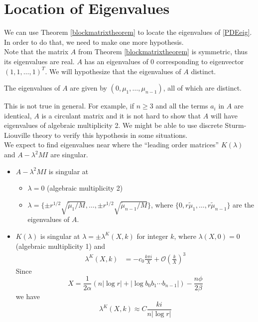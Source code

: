 \documentclass[thesis.tex]{subfiles}
\begin{document}
\section{Location of Eigenvalues}

We can use Theorem \ref{blockmatrixtheorem} to locate the eigenvalues of \eqref{PDEeig}. In order to do that, we need to make one more hypothesis.\\

Note that the matrix $A$ from Theorem \ref{blockmatrixtheorem} is symmetric, thus its eigenvalues are real. $A$ has an eigenvalues of 0 corresponding to eigenvector $(1, 1, \dots, 1)^T$. We will hypothesize that the eigenvalues of $A$ distinct. 

\begin{hypothesis}\label{Adistincteigs}
The eigenvalues of $A$ are given by $(0, \mu_1, \dots, \mu_{n-1})$, all of which are distinct.
\end{hypothesis}

This is not true in general. For example, if $n \geq 3$ and all the terms $a_i$ in $A$ are identical, $A$ is a circulant matrix and it is not hard to show that $A$ will have eigenvalues of algebraic multiplicity 2. We might be able to use discrete Sturm-Liouville theory to verify this hypothesis in some situations.\\

We expect to find eigenvalues near where the ``leading order matrices'' $K(\lambda)$ and $A - \lambda^2 MI$ are singular. 

\begin{itemize}
	\item $A - \lambda^2 M I$ is singular at 
	\begin{itemize}
		\item $\lambda = 0$ (algebraic multiplicity 2)
		\item $\lambda = \{ \pm r^{1/2} \sqrt{\tilde{\mu}_1/M}, \dots, \pm r^{1/2} \sqrt{\tilde{\mu}_{n-1}/M}\}$, where $\{0, r \tilde{\mu}_1, \dots, r \tilde{\mu}_{n-1}\}$ are the eigenvalues of $A$. 
	\end{itemize}

	\item $K(\lambda)$ is singular at $\lambda = \pm \lambda^K(X,k)$ for integer $k$, where $\lambda(X, 0) = 0$ (algebraic multiplicity 1) and
	\begin{align}\label{lambdaXk}
	\lambda^K(X,k)
		&= -c_0 \frac{k \pi i }{X} + \mathcal{O}\left(\frac{k}{X}\right)^3 
	\end{align}
	Since 
	\[
	X = \frac{1}{2\alpha} (n |\log r| + |\log b_0 b_1 \cdots b_{n-1}| ) - \frac{n \phi}{2 \beta}
	\]
	we have
	\[
	\lambda^K(X,k) \approx C \frac{k i}{n |\log r|}
	\]
\end{itemize}  
\end{document}
